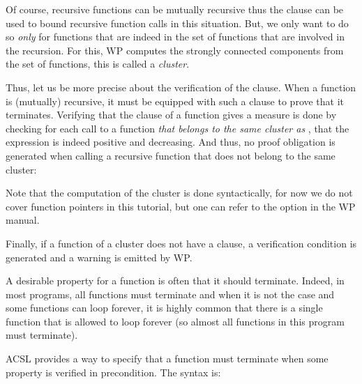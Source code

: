Of course, recursive functions can be mutually recursive thus the
 clause can be used to bound recursive function calls in
this situation. But, we only want to do so {\em only} for functions that are
indeed in the set of functions that are involved in the recursion. For this, WP
computes the strongly connected components from the set of functions, this is
called a {\em cluster}.

Thus, let us be more precise about the verification of the 
clause. When a function is (mutually) recursive, it must be equipped with such
a clause to prove that it terminates. Verifying that the 
clause of a function  gives a measure is done by checking for each
call to a function {\em that belongs to the same cluster as },
that the expression is indeed positive and decreasing. And thus, no proof
obligation is generated when calling a recursive function that does not belong
to the same cluster:




\begin{Information}
  Note that the computation of the cluster is done syntactically, for now we do
  not cover function pointers in this tutorial, but one can refer to the option
   in the WP manual.
\end{Information}


Finally, if a function of a cluster does not have a 
clause, a  verification condition is generated
and a warning is emitted by WP.









A desirable property for a function is often that it should terminate. Indeed,
in most programs, all functions must terminate and when it is not the case and
some functions can loop forever, it is highly common that there is a single
function that is allowed to loop forever (so almost all functions in this
program must terminate).






ACSL provides a way to specify that a function must terminate when some property
is verified in precondition. The syntax is:



